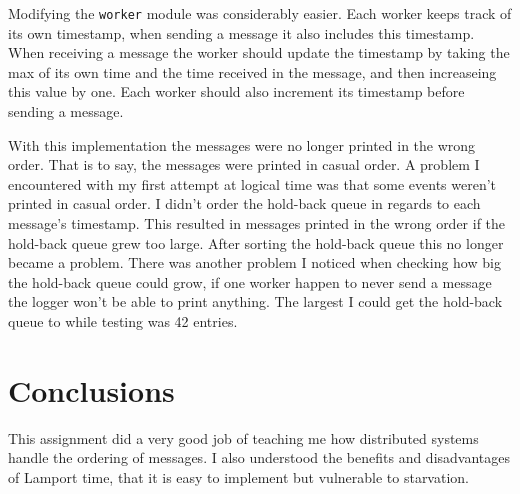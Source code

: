 \documentclass[a4paper, 11pt]{article}
\begin{document}
Modifying the \texttt{worker} module was considerably easier. Each worker keeps track of its own timestamp, when sending a message it also includes this timestamp. When receiving a message the worker should update the timestamp by taking the max of its own time and the time received in the message, and then increaseing this value by one. Each worker should also increment its timestamp before sending a message.

With this implementation the messages were no longer printed in the wrong order. That is to say, the messages were printed in casual order. A problem I encountered with my first attempt at logical time was that some events weren't printed in casual order. I didn't order the hold-back queue in regards to each message's timestamp. This resulted in messages printed in the wrong order if the hold-back queue grew too large. After sorting the hold-back queue this no longer became a problem. There was another problem I noticed when checking how big the hold-back queue could grow, if one worker happen to never send a message the logger won't be able to print anything. The largest I could get the hold-back queue to while testing was 42 entries.

\section{Conclusions}

This assignment did a very good job of teaching me how distributed systems handle the ordering of messages. I also understood the benefits and disadvantages of Lamport time, that it is easy to implement but vulnerable to starvation.
\end{document}
